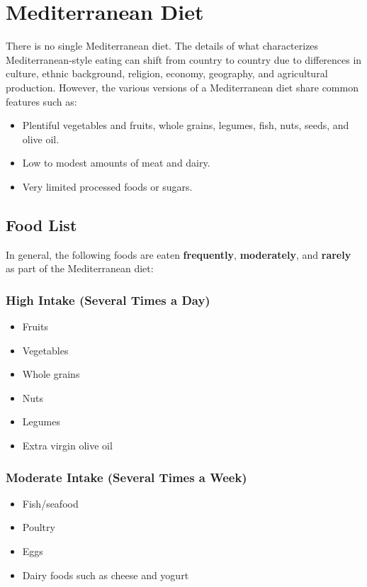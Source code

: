 \documentclass[8pt]{extarticle}
\begin{document}
\tableofcontents

\newpage


\section{Mediterranean Diet}

There is no single Mediterranean diet. The details of what characterizes Mediterranean-style eating can shift from country to country due to differences in culture, ethnic background, religion, economy, geography, and agricultural production. However, the various versions of a Mediterranean diet share common features such as:

\begin{itemize}
    \item Plentiful vegetables and fruits, whole grains, legumes, fish, nuts, seeds, and olive oil.
    \item Low to modest amounts of meat and dairy.
    \item Very limited processed foods or sugars.
\end{itemize}

\subsection{Food List}

In general, the following foods are eaten \textbf{frequently}, \textbf{moderately}, and \textbf{rarely} as part of the Mediterranean diet:

\subsubsection{High Intake (Several Times a Day)}
\begin{itemize}
    \item Fruits
    \item Vegetables
    \item Whole grains
    \item Nuts
    \item Legumes
    \item Extra virgin olive oil
\end{itemize}

\subsubsection{Moderate Intake (Several Times a Week)}
\begin{itemize}
    \item Fish/seafood
    \item Poultry
    \item Eggs
    \item Dairy foods such as cheese and yogurt
\end{itemize}
\end{document}
